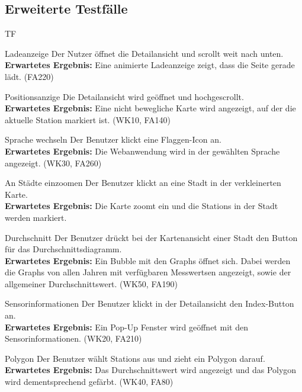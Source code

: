 \subsection{Erweiterte Testfälle}
\begin{Kriterien}{TF}

	\item[Ladeanzeige] Der Nutzer öffnet die  \gls{Detailansicht} und scrollt weit nach unten. \\ \textbf{Erwartetes Ergebnis:} Eine animierte Ladeanzeige zeigt, dass die Seite gerade lädt. (FA220)

	\item[Positionsanzige] Die Detailansicht wird geöffnet und hochgescrollt. \\ \textbf{Erwartetes Ergebnis:} Eine nicht bewegliche Karte wird angezeigt, auf der die aktuelle \gls{Station} markiert ist. (WK10, FA140)
	
	\item[Sprache wechseln] Der Benutzer klickt eine Flaggen-Icon an. \\ \textbf{Erwartetes Ergebnis:} Die Webanwendung wird in der gewählten Sprache angezeigt. (WK30, FA260) 
	
	\item[An Städte einzoomen] Der Benutzer klickt an eine Stadt in der verkleinerten Karte. \\ \textbf{Erwartetes Ergebnis:} Die Karte zoomt ein und die \glspl{Station} in der Stadt werden markiert.
	
	\item[Durchschnitt] Der Benutzer drückt bei der Kartenansicht einer Stadt den Button für das Durchschnittsdiagramm. \\ \textbf{Erwartetes Ergebnis:} Ein Bubble mit den \glspl{Graph} öffnet sich. Dabei werden die \glspl{Graph} von allen Jahren mit verfügbaren \glspl{Messwert}en angezeigt, sowie der allgemeiner Durchschnittswert. (WK50, FA190)
	
	\item[Sensorinformationen] Der Benutzer klickt in der Detailansicht den Index-Button an. \\ \textbf{Erwartetes Ergebnis:}  Ein Pop-Up Fenster
    wird geöffnet mit den Sensorinformationen. (WK20, FA210)

    \item[Polygon] Der Benutzer wählt \glspl{Station} aus und zieht ein Polygon darauf. \\ \textbf{Erwartetes Ergebnis:} Das Durchschnittswert wird angezeigt und das Polygon wird dementsprechend gefärbt. (WK40, FA80)
	

\end{Kriterien}
